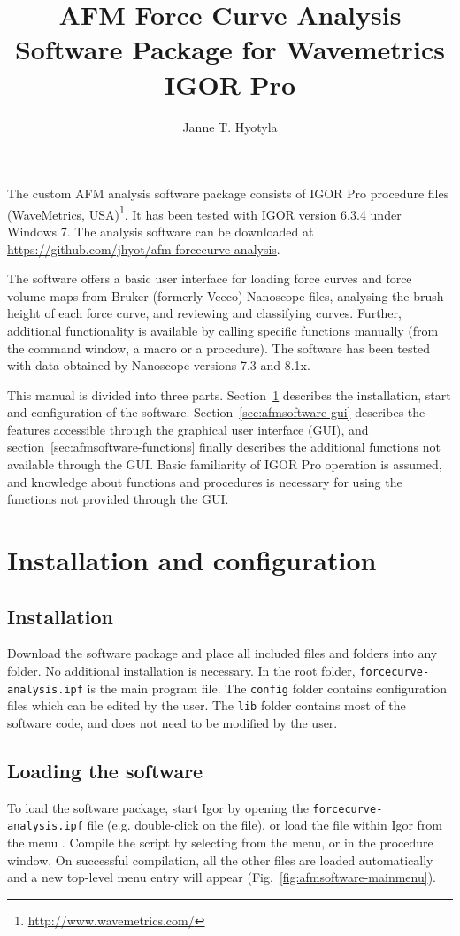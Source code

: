 \documentclass[12pt,a4paper]{article}
\title{AFM Force Curve Analysis Software Package for Wavemetrics IGOR Pro}
\author{Janne T. Hyotyla}
\date{}
\begin{document}
\maketitle


The custom AFM analysis software package consists of IGOR Pro procedure files (WaveMetrics, USA)\footnote{\url{http://www.wavemetrics.com/}}. It has been tested with IGOR version 6.3.4 under Windows 7. The analysis software can be downloaded at \url{https://github.com/jhyot/afm-forcecurve-analysis}.

The software offers a basic user interface for loading force curves and force volume maps from Bruker (formerly Veeco) Nanoscope files, analysing the brush height of each force curve, and reviewing and classifying curves.
Further, additional functionality is available by calling specific functions manually (from the command window, a macro or a procedure).
The software has been tested with data obtained by Nanoscope versions 7.3 and 8.1x.

This manual is divided into three parts. Section~\ref{sec:afmsoftware-config} describes the installation, start and configuration of the software.
Section~\ref{sec:afmsoftware-gui} describes the features accessible through the graphical user interface (GUI), and section~\ref{sec:afmsoftware-functions} finally describes the additional functions not available through the GUI.
Basic familiarity of IGOR Pro operation is assumed, and knowledge about functions and procedures is necessary for using the functions not provided through the GUI.

\section{Installation and configuration}
\label{sec:afmsoftware-config}

\subsection{Installation}
Download the software package and place all included files and folders into any folder. No additional installation is necessary.
In the root folder, \texttt{forcecur\-ve-analysis.ipf} is the main program file. The \texttt{config} folder contains configuration files which can be edited by the user.
The \texttt{lib} folder contains most of the software code, and does not need to be modified by the user.

\subsection{Loading the software}
To load the software package, start Igor by opening the \texttt{forcecurve-analysis.ipf} file (e.g. double-click on the file), or load the file within Igor from the menu .
Compile the script by selecting  from the menu, or  in the procedure window.
On successful compilation, all the other files are loaded automatically and a new top-level menu entry  will appear (Fig.~\ref{fig:afmsoftware-mainmenu}).
\end{document}
